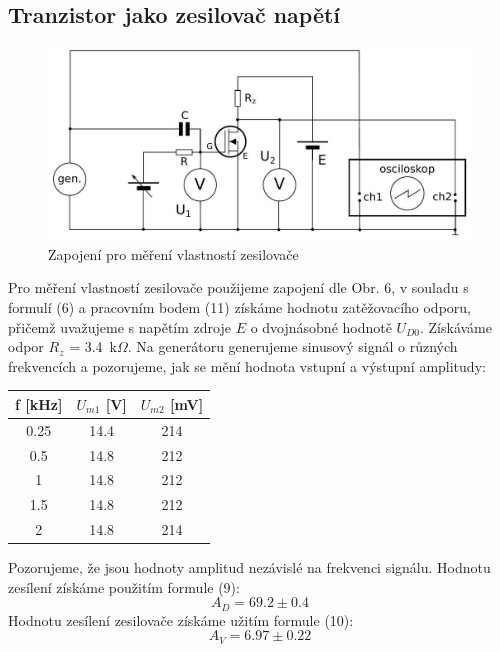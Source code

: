\documentclass[czech,11pt,a4paper]{article}
\begin{document}
\begin{multicols}{2}
\subsection{Tranzistor jako zesilovač napětí}
\begin{figure}[H]
	\begin{center}			
		\includegraphics[width=0.8\linewidth, ]{zapojeni3} 
		\caption{Zapojení pro měření vlastností zesilovače}
	\end{center}		
\end{figure} 
Pro měření vlastností zesilovače použijeme zapojení dle Obr. 6, v souladu s formulí (6) a pracovním bodem (11) získáme hodnotu zatěžovacího odporu, přičemž uvažujeme s napětím zdroje $E$ o dvojnásobné hodnotě $U_{D0}$. Získáváme odpor $R_z$ = 3.4 \,\rm k$\Omega$. Na generátoru generujeme sinusový signál o různých frekvencích a pozorujeme, jak se mění hodnota vstupní a výstupní amplitudy:
\begin{center}
	\begin{tabular}{|c|c|c|}
	\hline
	f [kHz] & $U_{m1}$ [V] & $U_{m2}$ [mV] \\ \hline
	0.25    & 14.4         & 214           \\ \hline
	0.5     & 14.8         & 212           \\ \hline
	1       & 14.8         & 212           \\ \hline
	1.5     & 14.8         & 212           \\ \hline
	2       & 14.8         & 214           \\ \hline
\end{tabular}
\end{center}
	Pozorujeme, že jsou hodnoty amplitud nezávislé na frekvenci signálu. Hodnotu zesílení získáme použitím formule (9):
	\begin{equation*}
	A_D =	69.2 \pm 0.4
	\end{equation*}
	Hodnotu zesílení zesilovače získáme užitím formule (10):
	\begin{equation}
		A_V = 6.97 \pm 0.22
	\end{equation}
	

\end{multicols}
\end{document}

